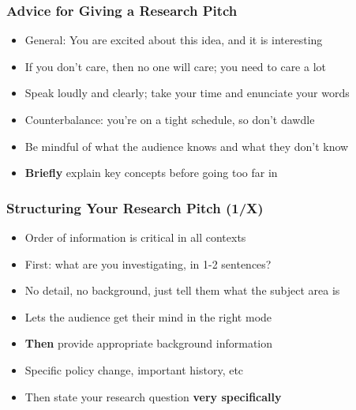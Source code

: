 \documentclass[aspectratio=169, handout]{beamer}
\begin{document}
\begin{frame}
\frametitle{Advice for Giving a Research Pitch}

\begin{itemize}
	\item General: You are excited about this idea, and it is interesting
	
	\item If you don't care, then no one will care; you need to care a lot
	
	\item <2->Speak loudly and clearly; take your time and enunciate your words
	
	\item <2->Counterbalance: you're on a tight schedule, so don't dawdle
	
	\item <3->Be mindful of what the audience knows and what they don't know
	
	\item <3->\textbf{Briefly} explain key concepts before going too far in
\end{itemize}
\end{frame}


\begin{frame}
\frametitle{Structuring Your Research Pitch (1/X)}

\begin{itemize}
	\item Order of information is critical in all contexts
	
	\item First: what are you investigating, in 1-2 sentences?
	
	\item No detail, no background, just tell them what the subject area is
	
	\item Lets the audience get their mind in the right mode
	
	\item \textbf{Then} provide appropriate background information
	
	\item Specific policy change, important history, etc
	
	\item Then state your research question \textbf{very specifically}
\end{itemize}
\end{frame}
\end{document}
